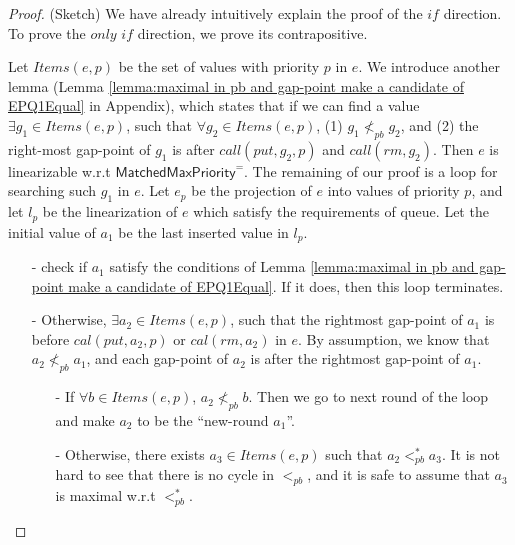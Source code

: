 \begin {proof} (Sketch)
We have already intuitively explain the proof of the $\textit{if}$ direction. To prove the $\textit{only if}$ direction, we prove its contrapositive. %

Let $\textit{Items}(e,p)$ be the set of values with priority $p$ in $e$. We introduce another lemma (Lemma \ref{lemma:maximal in pb and gap-point make a candidate of EPQ1Equal} in Appendix), which states that if we can find a value $\exists g_1 \in \textit{Items}(e,p)$, such that $\forall g_2 \in \textit{Items}(e,p)$, (1) $g_1 \nless_{\textit{pb}} g_2$, and (2) the right-most gap-point of $g_1$ is after $\textit{call}(\textit{put},g_2,p)$ and $\textit{call}(\textit{rm},g_2)$. Then $e$ is linearizable w.r.t $\mathsf{MatchedMaxPriority}^{=}$.
The remaining of our proof is a loop for searching such $g_1$ in $e$. Let $e_p$ be the projection of $e$ into values of priority $p$, and let $l_p$ be the linearization of $e$ which satisfy the requirements of queue. Let the initial value of $a_1$ be the last inserted value in $l_p$.

\begin{itemize}
\setlength{\itemsep}{0.5pt}
\item[-] check if $a_1$ satisfy the conditions of Lemma \ref{lemma:maximal in pb and gap-point make a candidate of EPQ1Equal}. If it does, then this loop terminates.

\item[-] Otherwise, $\exists a_2 \in \textit{Items}(e,p)$, such that the rightmost gap-point of $a_1$ is before $\textit{cal}(\textit{put},a_2,p)$ or $\textit{cal}(\textit{rm},a_2)$ in $e$. By assumption, we know that $a_2 \nless_{\textit{pb}} a_1$, and each gap-point of $a_2$ is after the rightmost gap-point of $a_1$.

    \begin{itemize}
    \setlength{\itemsep}{0.5pt}
    \item[-] If $\forall b \in \textit{Items}(e,p)$, $a_2\not<_{\textit{pb}}b$. Then we go to next round of the loop and make $a_2$ to be the ``new-round $a_1$''.
    \item[-] Otherwise, there exists $a_3 \in \textit{Items}(e,p)$ such that $a_2 <_{\textit{pb}}^* a_3$. It is not hard to see that there is no cycle in $<_{\textit{pb}}$, and it is safe to assume that $a_3$ is maximal w.r.t $<_{\textit{pb}}^*$.


\end{itemize}
\end{itemize}
\end{proof}
